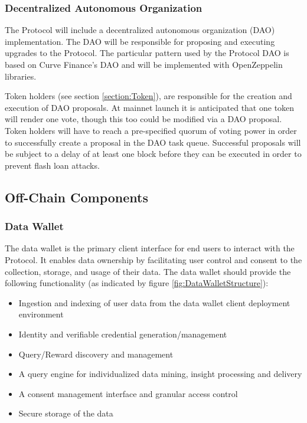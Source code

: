 \subsubsection{Decentralized Autonomous Organization}
\label{section:ImplementationDAO}

The Protocol will include a decentralized autonomous organization (DAO) implementation. The DAO will be responsible for proposing and executing upgrades to 
the Protocol. The particular pattern used by the Protocol DAO is based on Curve Finance's DAO and will be implemented with OpenZeppelin libraries. 

Token holders (see section \ref{section:Token}), are responsible for the creation and execution of DAO proposals. At mainnet launch it is anticipated that one 
token will render one vote, though this too could be modified via a DAO proposal. Token holders will have to reach a pre-specified quorum of voting power in 
order to successfully create a proposal in the DAO task queue. Successful proposals will be subject to a delay of at least one block before they can be executed 
in order to prevent flash loan attacks. 
\subsection{Off-Chain Components}
\label{section:OffChain}

\subsubsection{Data Wallet}
\label{section:DataWallet}



The data wallet is the primary client interface for end users to interact with the Protocol. It enables data ownership by facilitating user control 
and consent to the collection, storage, and usage of their data. The data wallet should provide the following functionality (as indicated 
by figure \ref{fig:DataWalletStructure}):

\begin{itemize}
  \item Ingestion and indexing of user data from the data wallet client deployment environment
  \item Identity and verifiable credential generation/management
  \item Query/Reward discovery and management
  \item A query engine for individualized data mining, insight processing and delivery
  \item A consent management interface and granular access control
  \item Secure storage of the data
\end{itemize}

